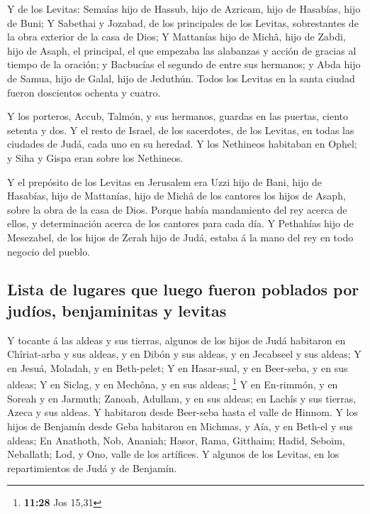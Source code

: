  Y de los Levitas: Semaías hijo de Hassub, hijo de
Azricam, hijo de Hasabías, hijo de Buni;  Y Sabethai y
Jozabad, de los principales de los Levitas, sobrestantes de la obra
exterior de la casa de Dios;  Y Mattanías hijo de Michâ,
hijo de Zabdi, hijo de Asaph, el principal, el que empezaba las
alabanzas y acción de gracias al tiempo de la oración; y Bacbucías el
segundo de entre sus hermanos; y Abda hijo de Samua, hijo de Galal, hijo
de Jeduthún.  Todos los Levitas en la santa ciudad fueron
doscientos ochenta y cuatro.

 Y los porteros, Accub, Talmón, y sus hermanos, guardas
en las puertas, ciento setenta y dos.  Y el resto de
Israel, de los sacerdotes, de los Levitas, en todas las ciudades de
Judá, cada uno en su heredad.  Y los Nethineos habitaban
en Ophel; y Siha y Gispa eran sobre los Nethineos.

 Y el prepósito de los Levitas en Jerusalem era Uzzi hijo
de Bani, hijo de Hasabías, hijo de Mattanías, hijo de Michâ de los
cantores los hijos de Asaph, sobre la obra de la casa de Dios.
 Porque había mandamiento del rey acerca de ellos, y
determinación acerca de los cantores para cada día.  Y
Pethahías hijo de Mesezabel, de los hijos de Zerah hijo de Judá, estaba
á la mano del rey en todo negocio del pueblo.

\hypertarget{lista-de-lugares-que-luego-fueron-poblados-por-juduxedos-benjaminitas-y-levitas}{%
\subsection{Lista de lugares que luego fueron poblados por judíos,
benjaminitas y
levitas}\label{lista-de-lugares-que-luego-fueron-poblados-por-juduxedos-benjaminitas-y-levitas}}

 Y tocante á las aldeas y sus tierras, algunos de los
hijos de Judá habitaron en Chîriat-arba y sus aldeas, y en Dibón y sus
aldeas, y en Jecabseel y sus aldeas;  Y en Jesuá,
Moladah, y en Beth-pelet;  Y en Hasar-sual, y en
Beer-seba, y en sus aldeas;  Y en Siclag, y en Mechôna, y
en sus aldeas; \footnote{\textbf{11:28} Jos 15,31}  Y en
En-rimmón, y en Soreah y en Jarmuth;  Zanoah, Adullam, y
en sus aldeas; en Lachîs y sus tierras, Azeca y sus aldeas. Y habitaron
desde Beer-seba hasta el valle de Hinnom.  Y los hijos de
Benjamín desde Geba habitaron en Michmas, y Aía, y en Beth-el y sus
aldeas;  En Anathoth, Nob, Ananiah; 
Hasor, Rama, Gitthaim;  Hadid, Seboim, Neballath;
 Lod, y Ono, valle de los artífices.  Y
algunos de los Levitas, en los repartimientos de Judá y de Benjamín.

